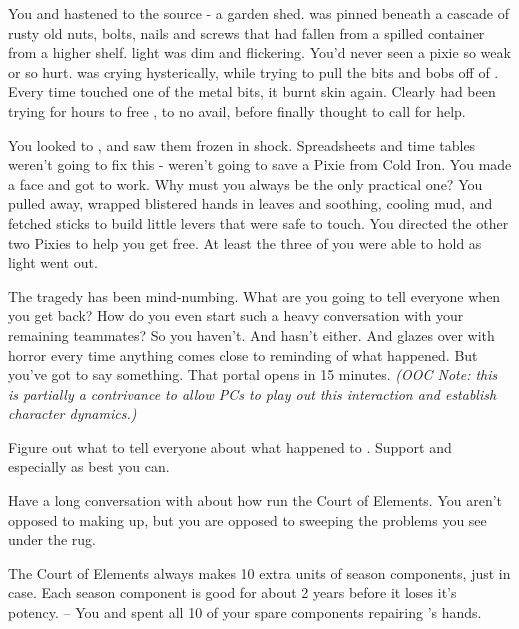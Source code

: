 \documentclass[char]{PP}
\begin{document}
You and \cSPM{} hastened to the source - a garden shed. \cFLost{} was pinned beneath a cascade of rusty old nuts, bolts, nails and screws that had fallen from a spilled container from a higher shelf. \cFLost{\Their} light was dim and flickering. You’d never seen a pixie so weak or so hurt. \cMChange{} was crying hysterically, while trying to pull the bits and bobs off of \cFLost{}. Every time \cMChange{} touched one of the metal bits, it burnt \cMChange{\their} skin again. Clearly \cMChange{\they} had been trying for hours to free \cFLost{}, to no avail, before \cMChange{\they} finally thought to call for help.

You looked to \cSPM{}, and saw them frozen in shock. Spreadsheets and time tables weren’t going to fix this - weren’t going to save a Pixie from Cold Iron. You made a face and got to work. Why must you always be the only practical one? You pulled \cMChange{} away, wrapped \cMChange{\their} blistered hands in leaves and soothing, cooling mud, and fetched sticks to build little levers that were safe to touch. You directed the other two Pixies to help you get \cFLost{} free. At least the three of you were able to hold \cFLost{\them} as \cFLost{\their} light went out.

The tragedy has been mind-numbing. What are you going to tell everyone when you get back? How do you even start such a heavy conversation with your remaining teammates? So you haven’t. And \cSPM{} hasn’t either. And \cMChange{} glazes over with horror every time anything comes close to reminding \cMChange{\them} of what happened. But you’ve got to say something. That portal opens in 15 minutes. \textit{(OOC Note: this is partially a contrivance to allow PCs to play out this interaction and establish character dynamics.)}


\begin{itemz}
	\item Figure out what to tell everyone about what happened to \cFLost{}. Support \cSPM{} and especially \cMChange{} as best you can.
	\item Have a long conversation with \cEHead{} about how \cEHead{\they} run\cEHead{\plural} the Court of Elements. You aren’t opposed to making up, but you are opposed to sweeping the problems you see under the rug.
\end{itemz}

\begin{itemz}[Notes]
	\item The Court of Elements always makes 10 extra units of season components, just in case. Each season component is good for about 2 years before it loses it's potency. -- You and \cSPM{} spent all 10 of your spare components repairing \cMChange{}'s hands.
\end{itemz}
\end{document}
